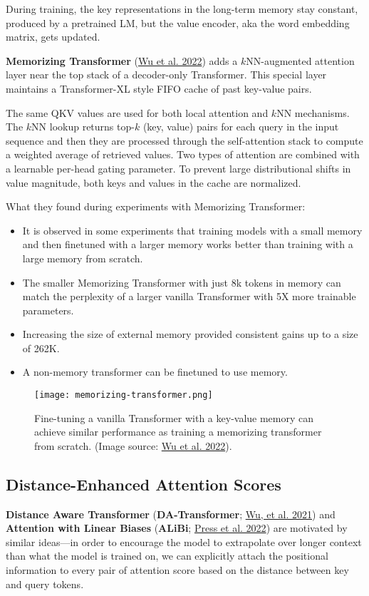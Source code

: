 \documentclass[12pt]{article}
\begin{document}
During training, the key representations in the long-term memory stay constant, produced by a pretrained LM, but the value encoder, aka the word embedding matrix, gets updated.

\textbf{Memorizing Transformer} (\href{https://arxiv.org/abs/2203.08913}{Wu et al. 2022}) adds a $k$NN-augmented attention layer near the top stack of a decoder-only Transformer. This special layer maintains a Transformer-XL style FIFO cache of past key-value pairs.

The same QKV values are used for both local attention and $k$NN mechanisms. The $k$NN lookup returns top-$k$ (key, value) pairs for each query in the input sequence and then they are processed through the self-attention stack to compute a weighted average of retrieved values. Two types of attention are combined with a learnable per-head gating parameter. To prevent large distributional shifts in value magnitude, both keys and values in the cache are normalized.

What they found during experiments with Memorizing Transformer:
\begin{itemize}
    \item It is observed in some experiments that training models with a small memory and then finetuned with a larger memory works better than training with a large memory from scratch.
    \item The smaller Memorizing Transformer with just 8k tokens in memory can match the perplexity of a larger vanilla Transformer with 5X more trainable parameters.
    \item Increasing the size of external memory provided consistent gains up to a size of 262K.
    \item A non-memory transformer can be finetuned to use memory.
\end{itemize}

\begin{figure}[h!]
    \centering
    \texttt{[image: memorizing-transformer.png]}
    \caption{Fine-tuning a vanilla Transformer with a key-value memory can achieve similar performance as training a memorizing transformer from scratch. (Image source: \href{https://arxiv.org/abs/2203.08913}{Wu et al. 2022}).}
\end{figure}

\subsection{Distance-Enhanced Attention Scores}
\textbf{Distance Aware Transformer} (\textbf{DA-Transformer}; \href{https://aclanthology.org/2021.naacl-main.166}{Wu, et al. 2021}) and \textbf{Attention with Linear Biases} (\textbf{ALiBi}; \href{https://arxiv.org/abs/2108.12409}{Press et al. 2022}) are motivated by similar ideas---in order to encourage the model to extrapolate over longer context than what the model is trained on, we can explicitly attach the positional information to every pair of attention score based on the distance between key and query tokens.
\end{document}
